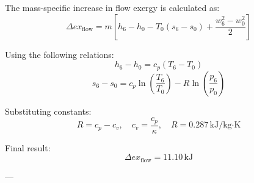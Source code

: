 The mass-specific increase in flow exergy is calculated as:  
\[
\Delta ex_{\text{flow}} = m \left[ h_6 - h_0 - T_0 (s_6 - s_0) + \frac{w_6^2 - w_0^2}{2} \right]
\]  

Using the following relations:  
\[
h_6 - h_0 = c_p (T_6 - T_0)
\]  
\[
s_6 - s_0 = c_p \ln \left( \frac{T_6}{T_0} \right) - R \ln \left( \frac{p_6}{p_0} \right)
\]  

Substituting constants:  
\[
R = c_p - c_v, \quad c_v = \frac{c_p}{\kappa}, \quad R = 0.287 \, \text{kJ/kg·K}
\]  

Final result:  
\[
\Delta ex_{\text{flow}} = 11.10 \, \text{kJ}
\]  

---